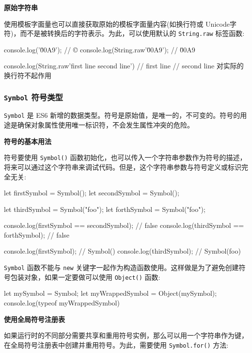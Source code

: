 \noindent\textbf{原始字符串}

使用模板字面量也可以直接获取原始的模板字面量内容(如换行符或 Unicode字符)，而不是被转换后的字符表示。为此，可以使用默认的 \texttt{String.raw} 标签函数:

\begin{JavaScript}
console.log('\u00A9');              // ©
console.log(String.raw'\u00A9');    // \u00A9

console.log(String.raw'first line
second line')     
// first line
// second line 对实际的换行符不起作用
\end{JavaScript}

\subsubsection{\texttt{Symbol} 符号类型}

\texttt{Symbol} 是 ES6 新增的数据类型。符号是原始值，是唯一的，不可变的。符号的用途是确保对象属性使用唯一标识符，不会发生属性冲突的危险。

\noindent\textbf{符号的基本用法}

符号要使用 \texttt{Symbol()} 函数初始化，也可以传入一个字符串参数作为符号的描述，将来可以通过这个字符串来调试代码。但是，这个字符串参数与符号定义或标识完全无关:

\begin{JavaScript}
let firstSymbol = Symbol();
let secondSymbol = Symbol();

let thirdSymbol = Symbol("foo");
let forthSymbol = Symbol("foo");

console.log(firstSymbol == secondSymbol);   // false
console.log(thirdSymbol == forthSymbol);    // false

console.log(firstSymbol);    // Symbol()
console.log(thirdSymbol);    // Symbol(foo)
\end{JavaScript}

\texttt{Symbol} 函数不能与 \texttt{new} 关键字一起作为构造函数使用。这样做是为了避免创建符号包装对象，如果一定要做可以使用 \texttt{Object()} 函数:

\begin{JavaScript}
let mySymbol = Symbol;
let myWrappedSymbol = Object(mySymbol);
console.log(typeof myWrappedSymbol)
\end{JavaScript}

\noindent\textbf{使用全局符号注册表}

如果运行时的不同部分需要共享和重用符号实例，那么可以用一个字符串作为键，在全局符号注册表中创建并重用符号。为此，需要使用 \texttt{Symbol.for()} 方法:

